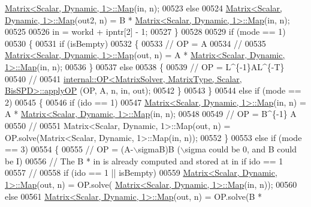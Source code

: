 \begin{DoxyCode}
      \hyperlink{group___core___module_class_eigen_1_1_matrix}{Matrix<Scalar, Dynamic, 1>::Map}(in, n);
00523           \textcolor{keywordflow}{else}
00524             \hyperlink{group___core___module_class_eigen_1_1_matrix}{Matrix<Scalar, Dynamic, 1>::Map}(out2, n) = B * 
      \hyperlink{group___core___module_class_eigen_1_1_matrix}{Matrix<Scalar, Dynamic, 1>::Map}(in, n);
00525           
00526           in = workd + ipntr[2] - 1;
00527       \}
00528 
00529       \textcolor{keywordflow}{if} (mode == 1)
00530       \{
00531         \textcolor{keywordflow}{if} (isBempty)
00532         \{
00533           \textcolor{comment}{// OP = A}
00534           \textcolor{comment}{//}
00535           \hyperlink{group___core___module_class_eigen_1_1_matrix}{Matrix<Scalar, Dynamic, 1>::Map}(out, n) = A * 
      \hyperlink{group___core___module_class_eigen_1_1_matrix}{Matrix<Scalar, Dynamic, 1>::Map}(in, n);
00536         \}
00537         \textcolor{keywordflow}{else}
00538         \{
00539           \textcolor{comment}{// OP = L^\{-1\}AL^\{-T\}}
00540           \textcolor{comment}{//}
00541           \hyperlink{struct_eigen_1_1internal_1_1_o_p}{internal::OP<MatrixSolver, MatrixType, Scalar, BisSPD>::applyOP}
      (OP, A, n, in, out);
00542         \}
00543       \}
00544       \textcolor{keywordflow}{else} \textcolor{keywordflow}{if} (mode == 2)
00545       \{
00546         \textcolor{keywordflow}{if} (ido == 1)
00547           \hyperlink{group___core___module_class_eigen_1_1_matrix}{Matrix<Scalar, Dynamic, 1>::Map}(in, n)  = A * 
      \hyperlink{group___core___module_class_eigen_1_1_matrix}{Matrix<Scalar, Dynamic, 1>::Map}(in, n);
00548         
00549         \textcolor{comment}{// OP = B^\{-1\} A}
00550         \textcolor{comment}{//}
00551         Matrix<Scalar, Dynamic, 1>::Map(out, n) = OP.solve(Matrix<Scalar, Dynamic, 1>::Map(in, n));
00552       \}
00553       \textcolor{keywordflow}{else} \textcolor{keywordflow}{if} (mode == 3)
00554       \{
00555         \textcolor{comment}{// OP = (A-\(\backslash\)sigmaB)B (\(\backslash\)sigma could be 0, and B could be I)}
00556         \textcolor{comment}{// The B * in is already computed and stored at in if ido == 1}
00557         \textcolor{comment}{//}
00558         \textcolor{keywordflow}{if} (ido == 1 || isBempty)
00559           \hyperlink{group___core___module_class_eigen_1_1_matrix}{Matrix<Scalar, Dynamic, 1>::Map}(out, n) = OP.solve(
      \hyperlink{group___core___module_class_eigen_1_1_matrix}{Matrix<Scalar, Dynamic, 1>::Map}(in, n));
00560         \textcolor{keywordflow}{else}
00561           \hyperlink{group___core___module_class_eigen_1_1_matrix}{Matrix<Scalar, Dynamic, 1>::Map}(out, n) = OP.solve(B * 

\end{DoxyCode}
